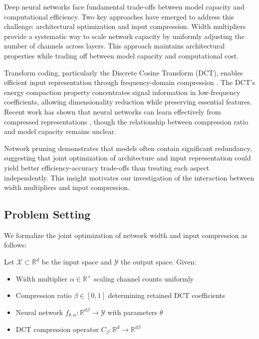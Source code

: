 \documentclass{article} %
\begin{document}
Deep neural networks face fundamental trade-offs between model capacity and computational efficiency. Two key approaches have emerged to address this challenge: architectural optimization and input compression. Width multipliers \citep{Howard2017MobileNetsEC} provide a systematic way to scale network capacity by uniformly adjusting the number of channels across layers. This approach maintains architectural properties while trading off between model capacity and computational cost.

Transform coding, particularly the Discrete Cosine Transform (DCT), enables efficient input representation through frequency-domain compression \citep{wang2022learning}. The DCT's energy compaction property concentrates signal information in low-frequency coefficients, allowing dimensionality reduction while preserving essential features. Recent work has shown that neural networks can learn effectively from compressed representations \citep{azimi2020structural}, though the relationship between compression ratio and model capacity remains unclear.

Network pruning \citep{LeCun1989OptimalBD, Han2015LearningBW} demonstrates that models often contain significant redundancy, suggesting that joint optimization of architecture and input representation could yield better efficiency-accuracy trade-offs than treating each aspect independently. This insight motivates our investigation of the interaction between width multipliers and input compression.

\subsection{Problem Setting}
We formalize the joint optimization of network width and input compression as follows:

Let $\mathcal{X} \subset \mathbb{R}^d$ be the input space and $\mathcal{Y}$ the output space. Given:
\begin{itemize}
    \item Width multiplier $\alpha \in \mathbb{R}^+$ scaling channel counts uniformly
    \item Compression ratio $\beta \in [0,1]$ determining retained DCT coefficients
    \item Neural network $f_{\theta,\alpha}: \mathbb{R}^{d\beta} \rightarrow \mathcal{Y}$ with parameters $\theta$
    \item DCT compression operator $C_\beta: \mathbb{R}^d \rightarrow \mathbb{R}^{d\beta}$
\end{itemize}
\end{document}
